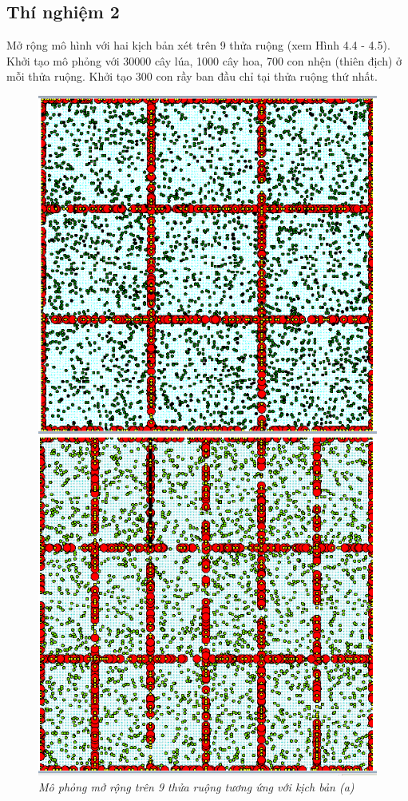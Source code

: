 \documentclass[13pt]{extreport}
\begin{document}
{\subsection{Thí nghiệm 2}
Mở rộng mô hình với hai kịch bản xét trên 9 thửa ruộng (xem Hình 4.4 - 4.5). Khởi tạo mô phỏng với 30000 cây lúa, 1000 cây hoa, 700 con nhện (thiên địch) ở mỗi thửa ruộng. Khởi tạo 300 con rầy ban đầu chỉ tại thửa ruộng thứ nhất.
\begin{figure}%
\begin{minipage}[b]{0.5\linewidth}
\includegraphics[scale=0.4]{kb91}
\caption{\textit{ Mô phỏng mở rộng trên 9 thửa ruộng tương ứng với kịch bản (a)}}
\end{minipage}
\hspace{0.5cm}
\begin{minipage}[b]{0.5\linewidth}
\includegraphics[scale=0.4]{kb92}

\end{minipage}
\end{figure}}
\end{document}
